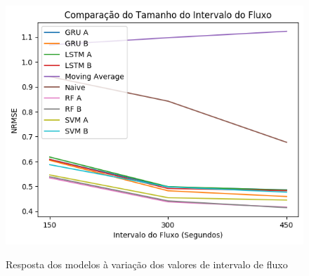 \begin{figure}[H]
    \centering
    \includegraphics[scale=0.9]{monography/img/comparisons/comparacao_do_tamanho_do_intervalo_do_fluxo_nrmse.png}
    \label{figure:res_flow}
    \caption{Resposta dos modelos à variação dos valores de intervalo de fluxo}
\end{figure}

